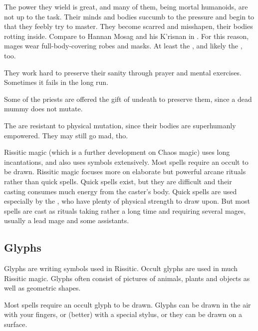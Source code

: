 The power they wield is great, and many of them, being mortal humanoids, are not up to the task. 
Their minds and bodies succumb to the pressure and begin to  that they feebly try to master. 
They become scarred and misshapen, their bodies rotting inside. 
Compare to Hannan Mosag and his K'risnan in \cite{StevenEriksonIanCameronEsslemont:MalazanBookoftheFallen}. 
For this reason, mages wear full-body-covering robes and masks. 
At least the \Shessefkesad, and likely the \Dzeyrgvin{}, too. 

They work hard to preserve their sanity through prayer and mental exercises. 
Sometimes it fails in the long run. 

Some of the priests are offered the gift of undeath to preserve them, since a dead mummy does not mutate. 

The  are resistant to physical mutation, since their bodies are superhumanly empowered. They may still go mad, tho. 

Rissitic magic (which is a further development on Chaos magic) uses long incantations, and also uses symbols extensively. 
Most spells require an occult  to be drawn. 
Rissitic magic focuses more on elaborate but powerful arcane rituals rather than quick spells. 
Quick spells exist, but they are difficult and their casting consumes much energy from the caster's body. 
Quick spells are used especially by the , who have plenty of physical strength to draw upon. 
But most spells are cast as rituals taking rather a long time and requiring several mages, usually a lead mage and some assistants. 









\subsection{Glyphs}
Glyphs are writing symbols used in Rissitic. 
Occult glyphs are used in much Rissitic magic. 
Glyphs often consist of pictures of animals, plants and objects as well as geometric shapes.

Most spells require an occult {glyph} to be drawn. 
Glyphs can be drawn in the air with your fingers, or (better) with a special stylus, or they can be drawn on a surface. 









